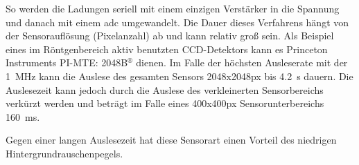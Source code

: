 \noindent
So werden die Ladungen seriell mit einem einzigen Verstärker in die Spannung und danach mit einem \gls{adc} umgewandelt. Die Dauer dieses Verfahrens hängt von der Sensorauflösung (Pixelanzahl) ab und kann relativ groß sein. Als Beispiel eines im Röntgenbereich aktiv benutzten CCD-Detektors kann es Princeton Instruments
PI-MTE: 2048B$^{\text{®}}$ dienen. Im Falle der höchsten Ausleserate mit der \SI{1}{\mega\hertz} \cite[s. 81, Readout charakterstik]{mte-manual} kann die Auslese des gesamten Sensors 2048x2048px bis \SI{4,2}{\second} dauern. Die Auslesezeit kann jedoch durch die Auslese des verkleinerten Sensorbereichs verkürzt werden und beträgt im Falle eines 400x400px Sensorunterbereichs \SI{160}{\milli\second}.

\noindent
Gegen einer langen Auslesezeit hat diese Sensorart einen Vorteil des niedrigen Hintergrundrauschenpegels.

